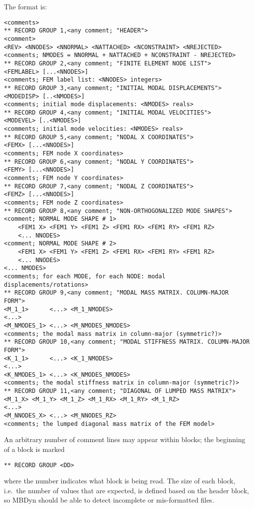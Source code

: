 The format is:
{\small
\begin{verbatim}
<comments>
** RECORD GROUP 1,<any comment; "HEADER">
<comment>
<REV> <NNODES> <NNORMAL> <NATTACHED> <NCONSTRAINT> <NREJECTED>
<comments; NMODES = NNORMAL + NATTACHED + NCONSTRAINT - NREJECTED>
** RECORD GROUP 2,<any comment; "FINITE ELEMENT NODE LIST">
<FEMLABEL> [...<NNODES>]
<comments; FEM label list: <NNODES> integers>
** RECORD GROUP 3,<any comment; "INITIAL MODAL DISPLACEMENTS">
<MODEDISP> [..<NMODES>]
<comments; initial mode displacements: <NMODES> reals>
** RECORD GROUP 4,<any comment; "INITIAL MODAL VELOCITIES">
<MODEVEL> [..<NMODES>]
<comments; initial mode velocities: <NMODES> reals>
** RECORD GROUP 5,<any comment; "NODAL X COORDINATES">
<FEMX> [...<NNODES>]
<comments; FEM node X coordinates>
** RECORD GROUP 6,<any comment; "NODAL Y COORDINATES">
<FEMY> [...<NNODES>]
<comments; FEM node Y coordinates>
** RECORD GROUP 7,<any comment; "NODAL Z COORDINATES">
<FEMZ> [...<NNODES>]
<comments; FEM node Z coordinates>
** RECORD GROUP 8,<any comment; "NON-ORTHOGONALIZED MODE SHAPES">
<comment; NORMAL MODE SHAPE # 1>
    <FEM1 X> <FEM1 Y> <FEM1 Z> <FEM1 RX> <FEM1 RY> <FEM1 RZ>
    <... NNODES>
<comment; NORMAL MODE SHAPE # 2>
    <FEM1 X> <FEM1 Y> <FEM1 Z> <FEM1 RX> <FEM1 RY> <FEM1 RZ>
    <... NNODES>
<... NMODES>
<comments; for each MODE, for each NODE: modal displacements/rotations>
** RECORD GROUP 9,<any comment; "MODAL MASS MATRIX. COLUMN-MAJOR FORM">
<M_1_1>      <...> <M_1_NMODES>
<...>
<M_NMODES_1> <...> <M_NMODES_NMODES>
<comments; the modal mass matrix in column-major (symmetric?)>
** RECORD GROUP 10,<any comment; "MODAL STIFFNESS MATRIX. COLUMN-MAJOR FORM">
<K_1_1>      <...> <K_1_NMODES>
<...>
<K_NMODES_1> <...> <K_NMODES_NMODES>
<comments; the modal stiffness matrix in column-major (symmetric?)>
** RECORD GROUP 11,<any comment; "DIAGONAL OF LUMPED MASS MATRIX">
<M_1_X> <M_1_Y> <M_1_Z> <M_1_RX> <M_1_RY> <M_1_RZ>
<...>
<M_NNODES_X> <...> <M_NNODES_RZ>
<comments; the lumped diagonal mass matrix of the FEM model>
\end{verbatim}
}

An arbitrary number of comment lines may appear within blocks;
the beginning of a block is marked
\begin{verbatim}
** RECORD GROUP <DD>
\end{verbatim}
where the number  indicates what block is being read.
The size of each block, i.e.\ the number of values that are expected,
is defined based on the header block, so MBDyn should be able to detect
incomplete or mis-formatted files.

